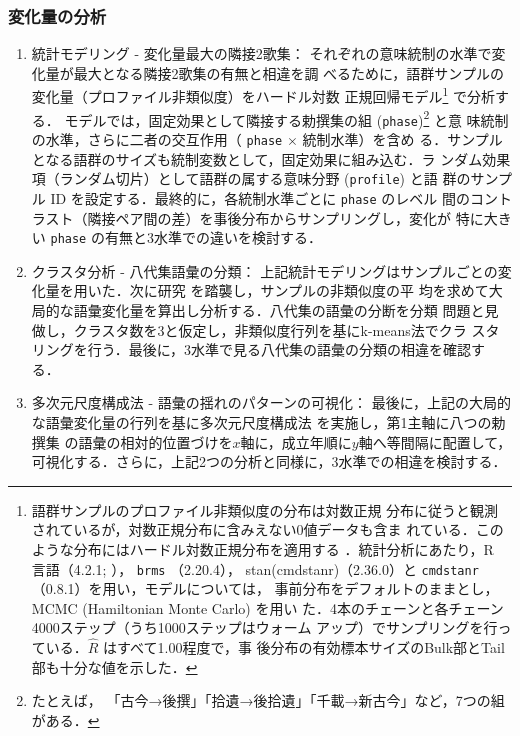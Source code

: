\documentclass[submit]{ipsj}
\begin{document}
\subsubsection{変化量の分析\label{orgbc13f40}}
\label{sec:orgb7a07db}
\begin{enumerate}
\item 統計モデリング - 変化量最大の隣接2歌集：\label{orgcd91abe}
\label{sec:orgab0d9e5}
それぞれの意味統制の水準で変化量が最大となる隣接2歌集の有無と相違を調
べるために，語群サンプルの変化量（プロファイル非類似度）をハードル対数
正規回帰モデル\footnote{語群サンプルのプロファイル非類似度の分布は対数正規
分布に従うと観測されているが，対数正規分布に含みえない0値データも含ま
れている．このような分布にはハードル対数正規分布を適用する
\cite{Chaudhry2018NGO}．統計分析にあたり，R 言語（4.2.1;
\cite{RCoreTeam2022Language}）， \texttt{brms} （2.20.4），
stan(cmdstanr)（2.36.0）と \texttt{cmdstanr} （0.8.1）を用い，モデルについては，
事前分布をデフォルトのままとし，MCMC (Hamiltonian Monte Carlo) を用い
た．4本のチェーンと各チェーン4000ステップ（うち1000ステップはウォーム
アップ）でサンプリングを行っている．\(\hat{R}\) はすべて1.00程度で，事
後分布の有効標本サイズのBulk部とTail部も十分な値を示した．} で分析する．
モデルでは，固定効果として隣接する勅撰集の組 (\texttt{phase})\footnote{たとえば，
「古今→後撰」「拾遺→後拾遺」「千載→新古今」など，7つの組がある．} と意
味統制の水準，さらに二者の交互作用（ \texttt{phase} \(\times\) 統制水準）を含め
る．サンプルとなる語群のサイズも統制変数として，固定効果に組み込む．ラ
ンダム効果項（ランダム切片）として語群の属する意味分野 (\texttt{profile}) と語
群のサンプル ID を設定する．最終的に，各統制水準ごとに \texttt{phase} のレベル
間のコントラスト（隣接ペア間の差）を事後分布からサンプリングし，変化が
特に大きい \texttt{phase} の有無と3水準での違いを検討する．
\item クラスタ分析 - 八代集語彙の分類：\label{orgb2d6cc6}
\label{sec:org576fcda}
上記統計モデリングはサンプルごとの変化量を用いた．次に研究
\cite{Speelman2003Profilebased} を踏襲し，サンプルの非類似度の平
均を求めて大局的な語彙変化量を算出し分析する．八代集の語彙の分断を分類
問題と見做し，クラスタ数を3と仮定し，非類似度行列を基にk-means法でクラ
スタリングを行う．最後に，3水準で見る八代集の語彙の分類の相違を確認す
る．
\item 多次元尺度構成法 - 語彙の揺れのパターンの可視化：\label{org4950a80}
\label{sec:orgce9a8b0}
最後に，上記の大局的な語彙変化量の行列を基に多次元尺度構成法
\cite{Kruskal1964Multidimensional} を実施し，第1主軸に八つの勅撰集
の語彙の相対的位置づけを\(x\)軸に，成立年順に\(y\)軸へ等間隔に配置して，
可視化する．さらに，上記2つの分析と同様に，3水準での相違を検討する．
\end{enumerate}
\end{document}
